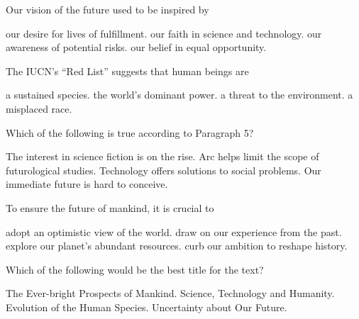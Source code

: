 \item Our vision of the future used to be inspired by
\begin{tasks}
	\task our desire for lives of fulfillment.
	\task our faith in science and technology.
	\task our awareness of potential risks.
	\task our belief in equal opportunity.
\end{tasks}
\item The IUCN's ``Red List'' suggests that human beings are
\begin{tasks}
	\task a sustained species.
	\task the world's dominant power.
	\task a threat to the environment.
	\task a misplaced race.
\end{tasks}
\item Which of the following is true according to Paragraph 5?
\begin{tasks}
	\task The interest in science fiction is on the rise.
	\task Arc helps limit the scope of futurological studies.
	\task Technology offers solutions to social problems.
	\task Our immediate future is hard to conceive.
\end{tasks}
\item To ensure the future of mankind, it is crucial to
\begin{tasks}
	\task adopt an optimistic view of the world.
	\task draw on our experience from the past.
	\task explore our planet's abundant resources.
	\task curb our ambition to reshape history.
\end{tasks}
\item Which of the following would be the best title for the text?
\begin{tasks}
	\task The Ever-bright Prospects of Mankind.
	\task Science, Technology and Humanity.
	\task Evolution of the Human Species.
	\task Uncertainty about Our Future.
\end{tasks}
